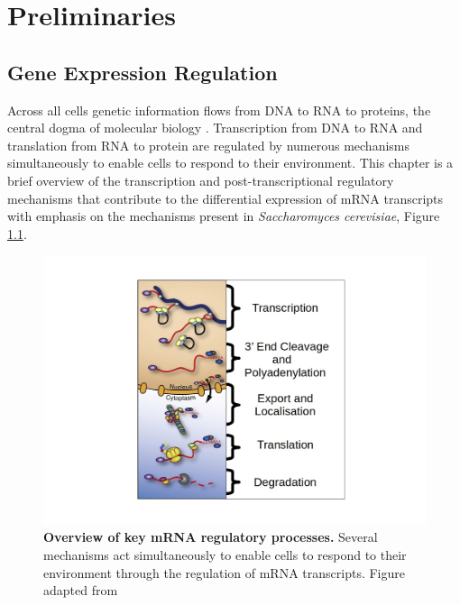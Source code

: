 \documentclass[../main.tex]{subfiles}
\begin{document}
\chapter{Preliminaries}

\section{Gene Expression Regulation}

Across all cells genetic information flows from DNA to RNA to proteins, the central dogma of molecular biology \parencite{Crick1970}.
Transcription from DNA to RNA and translation from RNA to protein are regulated by numerous mechanisms simultaneously to enable cells to respond to their environment.
This chapter is a brief overview of the transcription and post-transcriptional regulatory mechanisms that contribute to the differential expression of mRNA transcripts with emphasis on the mechanisms present in \textit{Saccharomyces cerevisiae}, Figure \ref{fig:mrna-regulation}. 

\begin{figure}[h]

{\centering \includegraphics[width=\linewidth]{figures/post-transcriptional-regulation} 

}

\caption[Overview of key mRNA regulatory processes.]{\textbf{Overview of key mRNA regulatory processes.} Several mechanisms act simultaneously to enable cells to respond to their environment through the regulation of mRNA transcripts. Figure adapted from \cite{Corbett2018}}\label{fig:mrna-regulation}
\end{figure}
\end{document}
